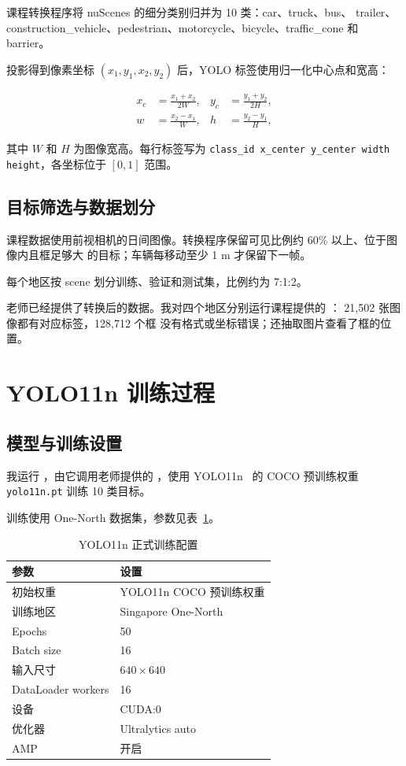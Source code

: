 \documentclass[UTF8,zihao=5,scheme=chinese]{ctexart}
\begin{document}
课程转换程序将 nuScenes 的细分类别归并为 10 类：car、truck、bus、
trailer、construction\_vehicle、pedestrian、motorcycle、bicycle、traffic\_cone 和 barrier。

投影得到像素坐标 $(x_1,y_1,x_2,y_2)$ 后，YOLO 标签使用归一化中心点和宽高：

\begin{align}
  x_c &= \frac{x_1+x_2}{2W}, & y_c &= \frac{y_1+y_2}{2H}, \\
  w &= \frac{x_2-x_1}{W}, & h &= \frac{y_2-y_1}{H},
\end{align}

其中 $W$ 和 $H$ 为图像宽高。每行标签写为
\texttt{class\_id x\_center y\_center width height}，各坐标位于 $[0,1]$ 范围。

\subsection{目标筛选与数据划分}

课程数据使用前视相机的日间图像。转换程序保留可见比例约 60\% 以上、位于图像内且框足够大
的目标；车辆每移动至少 1 m 才保留下一帧。

每个地区按 scene 划分训练、验证和测试集，比例约为 7:1:2。

老师已经提供了转换后的数据。我对四个地区分别运行课程提供的
：
21,502 张图像都有对应标签，128,712 个框
没有格式或坐标错误；还抽取图片查看了框的位置。

\section{YOLO11n 训练过程}

\subsection{模型与训练设置}

我运行 ，由它调用老师提供的 ，使用
YOLO11n~\cite{ultralytics} 的 COCO 预训练权重 \texttt{yolo11n.pt} 训练 10 类目标。

训练使用 One-North 数据集，参数见表~\ref{tab:training-config}。

\begin{table}[htbp]
  \centering
  \caption{YOLO11n 正式训练配置}
  \label{tab:training-config}
  \begin{tabular}{ll}
    \toprule
    参数 & 设置 \\
    \midrule
    初始权重 & YOLO11n COCO 预训练权重 \\
    训练地区 & Singapore One-North \\
    Epochs & 50 \\
    Batch size & 16 \\
    输入尺寸 & $640\times640$ \\
    DataLoader workers & 16 \\
    设备 & CUDA:0 \\
    优化器 & Ultralytics auto \\
    AMP & 开启 \\
    \bottomrule
  \end{tabular}
\end{table}
\end{document}
